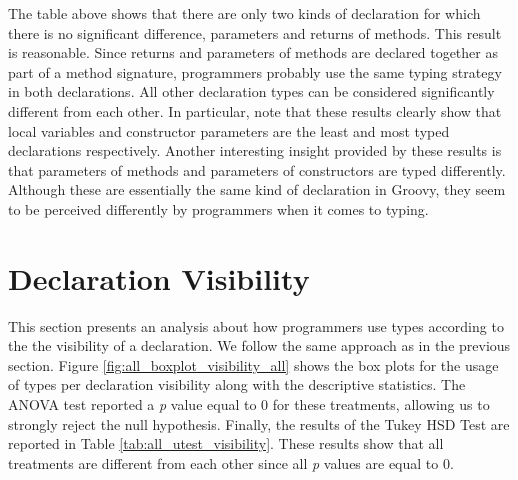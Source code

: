 \documentclass[msc]{ppgccufmg}
\begin{document}
The table above shows that there are only two kinds of declaration for which there is no significant difference, parameters and returns of methods.
This result is reasonable.
Since returns and parameters of methods are declared together as part of a method signature, programmers probably use the same typing strategy in both declarations.
All other declaration types can be considered significantly different from each other.
In particular, note that these results clearly show that local variables and constructor parameters are the least and most typed declarations respectively.
Another interesting insight provided by these results is that parameters of methods and parameters of constructors are typed differently.
Although these are essentially the same kind of declaration in Groovy, they seem to be perceived differently by programmers when it comes to typing.




\section{Declaration Visibility\label{sec:results-visibility}}

This section presents an analysis about how programmers use types according to the the visibility of a declaration.
We follow the same approach as in the previous section.
Figure \ref{fig:all_boxplot_visibility_all} shows the box plots for the usage of types per declaration visibility along with the descriptive statistics.
The ANOVA test reported a \emph{p} value equal to 0 for these treatments, allowing us to strongly reject the null hypothesis.
Finally, the results of the Tukey HSD Test are reported in Table \ref{tab:all_utest_visibility}.
These results show that all treatments are different from each other since all \emph{p} values are equal to 0.
\end{document}
